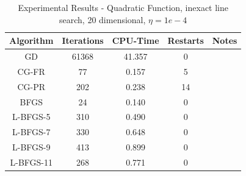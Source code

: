 \documentclass[12pt]{amsart}
\begin{document}
\begin{table}
\caption{Experimental Results - Quadratic Function, inexact line search, 20 dimensional, $\eta=1e-4$}
\label{table_inexact_quad}
\begin{center}
\begin{tabular}{|c||c||c||c||c|}
\hline
Algorithm & Iterations & CPU-Time & Restarts & Notes\\
\hline
GD & 61368 & 41.357 & 0 & \\
\hline
CG-FR & 77 & 0.157 & 5 & \\
\hline
CG-PR & 202 & 0.238 & 14 & \\
\hline
BFGS & 24 & 0.140& 0 & \\
\hline
L-BFGS-5 & 310 & 0.490 & 0 &\\
\hline
L-BFGS-7 & 330 & 0.648 & 0 &\\
\hline
L-BFGS-9 & 413 & 0.899 & 0 &\\
\hline
L-BFGS-11 & 268 & 0.771& 0 &\\
\hline
\end{tabular}
\end{center}
\end{table}
\end{document}
